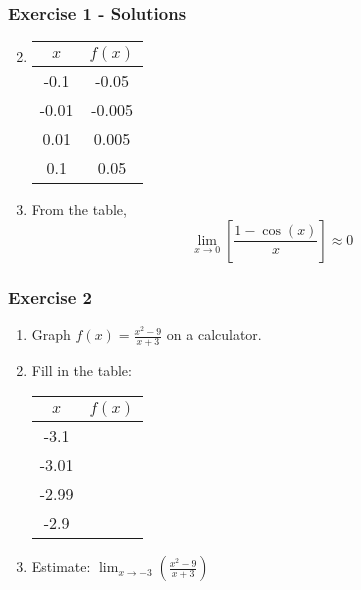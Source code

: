 \documentclass[12pt]{beamer}
\begin{document}
\begin{frame}
	\frametitle{Exercise 1 - Solutions} %
	\begin{multicols}{2}
		\begin{enumerate}
			\setcounter{enumi}{1}
			\large

			\item \begin{table}[]
				      \begin{tabular}{c|c}
					      $x$   & $f(x)$ \\ \hline
					      -0.1  & -0.05  \\
					      -0.01 & -0.005 \\
					      0.01  & 0.005  \\
					      0.1   & 0.05
				      \end{tabular}
			      \end{table}
			\item From the table, \[\displaystyle\lim_{x\to 0}\left[\frac{1-\cos(x)}{x}\right]\approx \boxed{0}\]
		\end{enumerate}
	\end{multicols}
\end{frame}
\begin{frame}
	\frametitle{Exercise 2}
	\initclock
	\large
	\begin{enumerate}
		\item Graph $f(x) = \frac{x^2-9}{x+3}$ on a calculator.
		      \vspace*{\fill}
		      \vspace*{\fill}
		\item Fill in the table:
		      \small
		      \begin{table}[]
			      \begin{tabular}{c|c}
				      $x$   & $f(x)$ \\ \hline
				      -3.1  &        \\
				      -3.01 &        \\
				      -2.99 &        \\
				      -2.9  &
			      \end{tabular}
		      \end{table}
		      \large
		      \vspace*{\fill}
		      \vspace*{\fill}
		\item Estimate: $\displaystyle\lim_{x\to -3}\left(\frac{x^2-9}{x+3}\right)$
	\end{enumerate}
	\vspace*{\fill}
	\vspace*{\fill}
	\vspace*{\fill}
	\vspace*{\fill}
	\crono
\end{frame}
\end{document}
